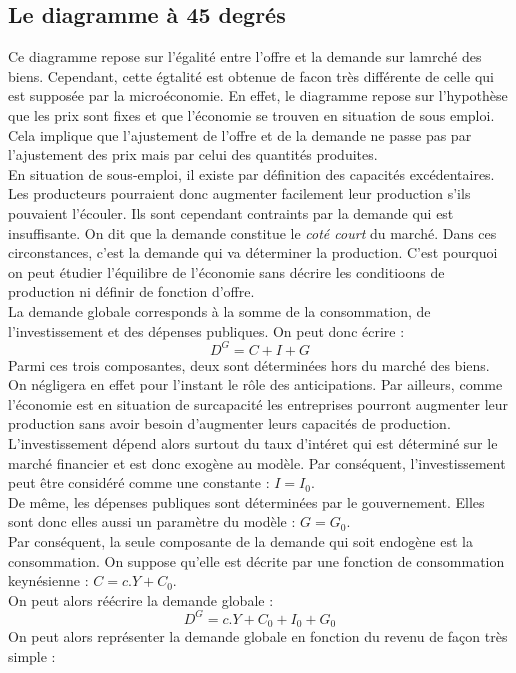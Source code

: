 \documentclass[10pt]{book}
\begin{document}
\subsection{Le diagramme à 45 degrés}
Ce diagramme repose sur l'égalité entre l'offre et la demande sur lamrché des biens. Cependant, cette égtalité est obtenue de facon très différente de celle qui est supposée par la  microéconomie. En effet, le diagramme repose sur l'hypothèse que les prix sont fixes et que l'économie se trouven en situation de sous emploi. Cela implique que l'ajustement de l'offre et de la demande ne passe pas par l'ajustement des prix mais par celui des quantités produites. \\
En situation de sous-emploi, il existe par définition des capacités excédentaires. Les producteurs pourraient donc augmenter facilement leur production s'ils pouvaient l'écouler. Ils sont cependant contraints par la demande qui est insuffisante. On dit que la demande constitue le \textit{coté court} du marché. Dans ces circonstances, c'est la demande qui va déterminer la production. C'est pourquoi on peut étudier l'équilibre de l'économie sans décrire les conditioons de production ni définir de fonction d'offre. \\
La demande globale corresponds à la somme de la consommation, de l'investissement et des dépenses publiques. On peut donc écrire :
$$ D^G = C + I + G$$
Parmi ces trois composantes, deux sont déterminées hors du marché des biens. On négligera en effet pour l'instant le rôle des anticipations. Par ailleurs, comme l'économie est en situation de surcapacité les entreprises pourront augmenter leur production sans avoir besoin d'augmenter leurs capacités de production. \\
L'investissement dépend alors surtout du taux d'intéret qui est déterminé sur le marché financier et est donc exogène au modèle. Par conséquent, l'investissement peut être considéré comme une constante : $I = I_0$. \\
De même, les dépenses publiques sont déterminées par le gouvernement. Elles sont donc elles aussi un paramètre du modèle : $G = G_0$. \\
Par conséquent, la seule composante de la demande qui soit endogène est la consommation. On suppose qu'elle est décrite par une fonction de consommation keynésienne : $C = c.Y + C_0$. \\
On peut alors réécrire la demande globale :
$$ D^G = c.Y + C_0 + I_0 + G_0 $$
On peut alors représenter la demande globale en fonction du revenu de façon très simple :
\end{document}

